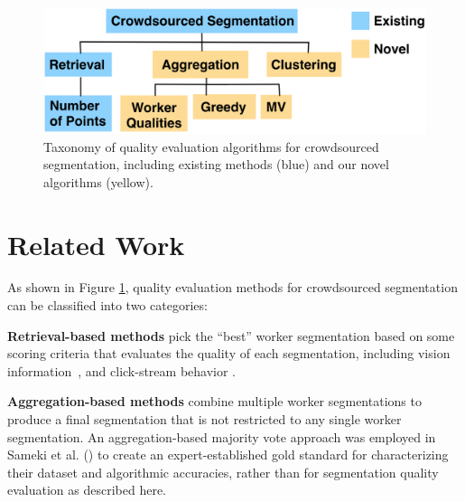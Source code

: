 \documentclass[letterpaper]{article}
\newcommand{\stitle}[1]{\noindent \textbf{#1}}
\begin{document}
\begin{figure}
\centering
\includegraphics[width=0.7\linewidth]{plots/flowchart.png}
\caption{Taxonomy of quality evaluation algorithms for crowdsourced segmentation, including existing methods (blue) and our novel algorithms (yellow).
} %
\label{flowchart}
\end{figure}
\section{Related Work\label{sec:related}}
As shown in Figure \ref{flowchart}, quality evaluation methods for crowdsourced segmentation can be classified into two categories:

\stitle{Retrieval-based methods} pick the ``best'' worker segmentation based on some scoring criteria that evaluates the quality of each segmentation, including vision information~\cite{Vittayakorn2011,Russakovsky2015}, and click-stream behavior \cite{Cabezas2015,Sameki2015,Sorokin2008}.%

\stitle{Aggregation-based methods} combine multiple worker segmentations to produce a final segmentation that is not restricted to any single worker segmentation. An aggregation-based majority vote approach was employed in Sameki et al. (\citeyear{Sameki2015}) to create an expert-established gold standard for characterizing their dataset and algorithmic accuracies, rather than for segmentation quality evaluation as described here.
\end{document}
